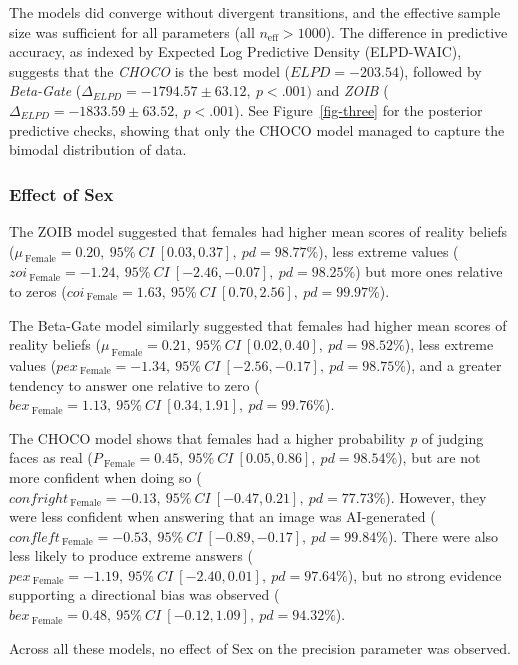 \documentclass[
  jou,
  floatsintext,
  longtable,
  nolmodern,
  notxfonts,
  notimes,
  colorlinks=true,linkcolor=blue,citecolor=blue,urlcolor=blue]{apa7}
\begin{document}
The models did converge without divergent transitions, and the effective
sample size was sufficient for all parameters (all
\(n_{\text{eff}} > 1000\)). The difference in predictive accuracy, as
indexed by Expected Log Predictive Density (ELPD-WAIC), suggests that
the \emph{CHOCO} is the best model (\(ELPD = -203.54\)), followed by
\emph{Beta-Gate} (\(\Delta_{ELPD} = -1794.57 \pm 63.12, ~p < .001)\) and
\emph{ZOIB} (\(\Delta_{ELPD} = -1833.59 \pm 63.52, ~p < .001\)). See
Figure~\ref{fig-three} for the posterior predictive checks, showing that
only the CHOCO model managed to capture the bimodal distribution of
data.

\subsubsection{Effect of Sex}\label{effect-of-sex}

The ZOIB model suggested that females had higher mean scores of reality
beliefs
(\(\mu_{~\text{Female}} = 0.20,~95\%~ CI~[0.03, 0.37], ~pd = 98.77\%\)),
less extreme values
(\(zoi_{~\text{Female}} = -1.24,~95\%~ CI~[-2.46, -0.07], ~pd = 98.25\%\))
but more ones relative to zeros
(\(coi_{~\text{Female}} = 1.63,~95\%~ CI~[0.70, 2.56], ~pd = 99.97\%\)).

The Beta-Gate model similarly suggested that females had higher mean
scores of reality beliefs
(\(\mu_{~\text{Female}} = 0.21,~95\%~ CI~[0.02, 0.40], ~pd = 98.52\%\)),
less extreme values
(\(pex_{~\text{Female}} = -1.34,~95\%~ CI~[-2.56, -0.17], ~pd = 98.75\%\)),
and a greater tendency to answer one relative to zero
(\(bex_{~\text{Female}} = 1.13,~95\%~ CI~[0.34, 1.91], ~pd = 99.76\%\)).

The CHOCO model shows that females had a higher probability \emph{p} of
judging faces as real
(\(P_{~\text{Female}} = 0.45,~95\%~ CI~[0.05, 0.86], ~pd = 98.54\%\)),
but are not more confident when doing so
(\(confright_{~\text{Female}} = -0.13,~95\%~ CI~[-0.47, 0.21], ~pd = 77.73\%\)).
However, they were less confident when answering that an image was
AI-generated
(\(confleft_{~\text{Female}} = -0.53,~95\%~ CI~[-0.89, -0.17], ~pd = 99.84\%\)).
There were also less likely to produce extreme answers
(\(pex_{~\text{Female}} = -1.19,~95\%~ CI~[-2.40, 0.01], ~pd = 97.64\%\)),
but no strong evidence supporting a directional bias was observed
(\(bex_{~\text{Female}} = 0.48,~95\%~ CI~[-0.12, 1.09], ~pd = 94.32\%\)).

Across all these models, no effect of Sex on the precision parameter was
observed.
\end{document}

